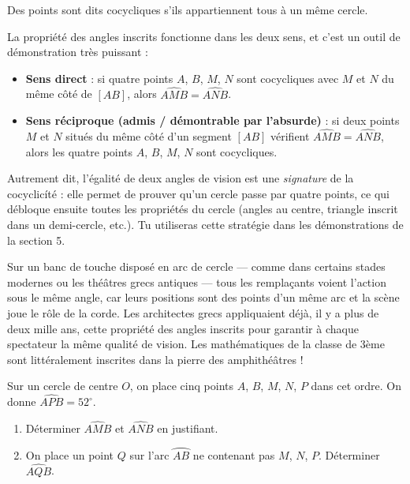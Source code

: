 \documentclass[11pt]{article}
\newcommand{\cle}[1]{{\popxbold\color{popdark}#1}}
\begin{document}
\begin{definition}
Des points sont dits \cle{cocycliques} s'ils appartiennent tous \`a un \cle{m\^eme cercle}.
\end{definition}

La propri\'et\'e des angles inscrits fonctionne dans les deux sens, et c'est un outil de d\'emonstration tr\`es puissant :
\begin{itemize}
\item \textbf{Sens direct} : si quatre points $A$, $B$, $M$, $N$ sont cocycliques avec $M$ et $N$ du m\^eme c\^ot\'e de $[AB]$, alors $\widehat{AMB} = \widehat{ANB}$.
\item \textbf{Sens r\'eciproque (admis / d\'emontrable par l'absurde)} : si deux points $M$ et $N$ situ\'es du m\^eme c\^ot\'e d'un segment $[AB]$ v\'erifient $\widehat{AMB} = \widehat{ANB}$, alors les quatre points $A$, $B$, $M$, $N$ sont cocycliques.
\end{itemize}

Autrement dit, l'\'egalit\'e de deux angles de vision est une \emph{signature} de la cocyclic\'it\'e : elle permet de prouver qu'un cercle passe par quatre points, ce qui d\'ebloque ensuite toutes les propri\'et\'es du cercle (angles au centre, triangle inscrit dans un demi-cercle, etc.). Tu utiliseras cette strat\'egie dans les d\'emonstrations de la section 5.

\begin{savaistu}
Sur un banc de touche dispos\'e en arc de cercle — comme dans certains stades modernes ou les th\'e\^atres grecs antiques — tous les rempla\c{c}ants voient l'action sous le m\^eme angle, car leurs positions sont des points d'un m\^eme arc et la sc\`ene joue le r\^ole de la corde. Les architectes grecs appliquaient d\'ej\`a, il y a plus de deux mille ans, cette propri\'et\'e des angles inscrits pour garantir \`a chaque spectateur la m\^eme qualit\'e de vision. Les math\'ematiques de la classe de 3\`eme sont litt\'eralement inscrites dans la pierre des amphith\'e\^atres !
\end{savaistu}

\begin{exercice}
Sur un cercle de centre $O$, on place cinq points $A$, $B$, $M$, $N$, $P$ dans cet ordre. On donne $\widehat{APB} = 52^\circ$.
\begin{enumerate}
\item D\'eterminer $\widehat{AMB}$ et $\widehat{ANB}$ en justifiant.
\item On place un point $Q$ sur l'arc $\wideparen{AB}$ ne contenant pas $M$, $N$, $P$. D\'eterminer $\widehat{AQB}$.
\end{enumerate}
\end{exercice}
\end{document}
